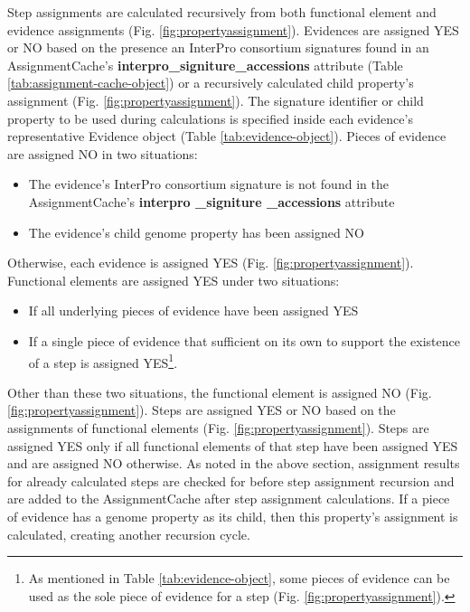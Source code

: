 Step assignments are calculated recursively from both functional element and evidence assignments (Fig. \ref{fig:propertyassignment}). Evidences are assigned YES or NO based on the presence an InterPro consortium signatures found in an AssignmentCache's \textbf{interpro\_signiture\_accessions} attribute (Table \ref{tab:assignment-cache-object}) or a recursively calculated child property's assignment (Fig. \ref{fig:propertyassignment}). The signature identifier or child property to be used during calculations is specified inside each evidence's representative Evidence object (Table \ref{tab:evidence-object}). Pieces of evidence are assigned NO in two situations: 

\begin{itemize}
\item The evidence's InterPro consortium signature is not found in the AssignmentCache's \textbf{interpro \_signiture \_accessions} attribute 
\item The evidence's child genome property has been assigned NO 
\end{itemize}
Otherwise, each evidence is assigned YES (Fig. \ref{fig:propertyassignment}). Functional elements are assigned YES under two situations: 

\begin{itemize}
\item If all underlying pieces of evidence have been assigned YES
\item If a single piece of evidence that sufficient on its own to support the existence of a step is assigned YES\footnote{As mentioned in Table \ref{tab:evidence-object}, some pieces of evidence can be used as the sole piece of evidence for a step (Fig. \ref{fig:propertyassignment}).}.
\end{itemize}

Other than these two situations, the functional element is assigned NO (Fig. \ref{fig:propertyassignment}). Steps are assigned YES or NO based on the assignments of functional elements (Fig. \ref{fig:propertyassignment}). Steps are assigned YES only if all functional elements of that step have been assigned YES and are assigned NO otherwise. As noted in the above section, assignment results for already calculated steps are checked for before step assignment recursion and are added to the AssignmentCache after step assignment calculations. If a piece of evidence has a genome property as its child, then this property's assignment is calculated, creating another recursion cycle.

